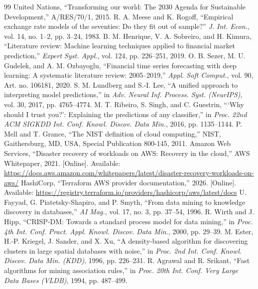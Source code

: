 \documentclass[conference]{IEEEtran}
\begin{document}
\begin{thebibliography}{99}
 United Nations, ``Transforming our world: The 2030 Agenda for Sustainable Development,'' A/RES/70/1, 2015.
 R. A. Meese and K. Rogoff, ``Empirical exchange rate models of the seventies: Do they fit out of sample?'' \emph{J. Int. Econ.}, vol. 14, no. 1--2, pp. 3--24, 1983.
 B. M. Henrique, V. A. Sobreiro, and H. Kimura, ``Literature review: Machine learning techniques applied to financial market prediction,'' \emph{Expert Syst. Appl.}, vol. 124, pp. 226--251, 2019.
 O. B. Sezer, M. U. Gudelek, and A. M. Ozbayoglu, ``Financial time series forecasting with deep learning: A systematic literature review: 2005--2019,'' \emph{Appl. Soft Comput.}, vol. 90, Art. no. 106181, 2020.
 S. M. Lundberg and S.-I. Lee, ``A unified approach to interpreting model predictions,'' in \emph{Adv. Neural Inf. Process. Syst. (NeurIPS)}, vol. 30, 2017, pp. 4765--4774.
 M. T. Ribeiro, S. Singh, and C. Guestrin, ```Why should I trust you?': Explaining the predictions of any classifier,'' in \emph{Proc. 22nd ACM SIGKDD Int. Conf. Knowl. Discov. Data Min.}, 2016, pp. 1135--1144.
 P. Mell and T. Grance, ``The NIST definition of cloud computing,'' NIST, Gaithersburg, MD, USA, Special Publication 800-145, 2011.
 Amazon Web Services, ``Disaster recovery of workloads on AWS: Recovery in the cloud,'' AWS Whitepaper, 2021. [Online]. Available: \url{https://docs.aws.amazon.com/whitepapers/latest/disaster-recovery-workloads-on-aws/}
 HashiCorp, ``Terraform AWS provider documentation,'' 2026. [Online]. Available: \url{https://registry.terraform.io/providers/hashicorp/aws/latest/docs}
 U. Fayyad, G. Piatetsky-Shapiro, and P. Smyth, ``From data mining to knowledge discovery in databases,'' \emph{AI Mag.}, vol. 17, no. 3, pp. 37--54, 1996.
 R. Wirth and J. Hipp, ``CRISP-DM: Towards a standard process model for data mining,'' in \emph{Proc. 4th Int. Conf. Pract. Appl. Knowl. Discov. Data Min.}, 2000, pp. 29--39.
 M. Ester, H.-P. Kriegel, J. Sander, and X. Xu, ``A density-based algorithm for discovering clusters in large spatial databases with noise,'' in \emph{Proc. 2nd Int. Conf. Knowl. Discov. Data Min. (KDD)}, 1996, pp. 226--231.
 R. Agrawal and R. Srikant, ``Fast algorithms for mining association rules,'' in \emph{Proc. 20th Int. Conf. Very Large Data Bases (VLDB)}, 1994, pp. 487--499.

\end{thebibliography}
\end{document}
